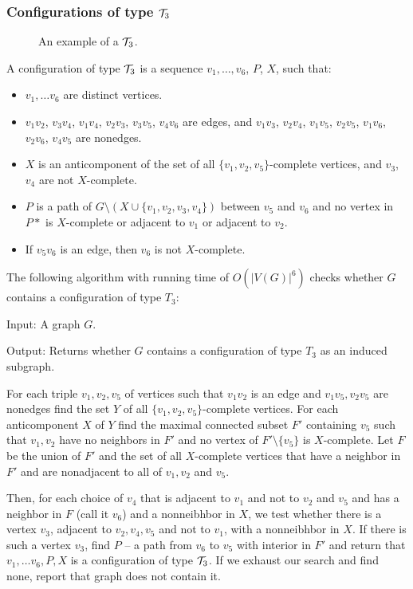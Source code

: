 \subsubsection{Configurations of type $\mathcal{T}_3$}

\begin{wrapfigure}{r}{0.35\textwidth}
	
	\caption{An example of a $\mathcal{T}_3$.}%
	\vspace{-1.5cm}
\end{wrapfigure}

A configuration of type $\mathcal{T}_3$ is a sequence $v_1, \ldots, v_6$, $P$, $X$, such that:
\begin{itemize}
	\item $v_1, \ldots v_6$ are distinct vertices.
	\item $v_1v_2$, $v_3v_4$, $v_1v_4$, $v_2v_3$, $v_3v_5$, $v_4v_6$ are edges, and $v_1v_3$, $v_2v_4$, $v_1v_5$, $v_2v_5$, $v_1v_6$, $v_2v_6$, $v_4v_5$ are nonedges.
	\item $X$ is an anticomponent of the set of all $\{v_1, v_2, v_5\}$-complete vertices, and $v_3$, $v_4$ are not $X$-complete.
	\item $P$ is a path of $G \setminus ( X \cup \{v_1, v_2, v_3, v_4\} )$ between $v_5$ and $v_6$ and no vertex in $P*$ is $X$-complete or adjacent to $v_1$ or adjacent to $v_2$.
	\item If $v_5v_6$ is an edge, then $v_6$ is not $X$-complete.
\end{itemize}

The following algorithm with running time of $O(|V(G)|^6)$ checks whether $G$ contains a configuration of type $T_3$:

\begin{alg}
	\label{alg:t3}
	Input: A graph $G$.

	\noindent Output: Returns whether $G$ contains a configuration of type $T_3$ as an induced subgraph.
\end{alg}
\begin{algtext}
	
For each triple $v_1, v_2, v_5$ of vertices such that $v_1v_2$ is an edge and $v_1v_5, v_2v_5$ are nonedges find the set $Y$ of all $\{v_1, v_2, v_5\}$-complete vertices. For each anticomponent $X$ of $Y$ find the maximal connected subset $F'$ containing $v_5$ such that $v_1, v_2$ have no neighbors in $F'$ and no vertex of $F'\setminus\{v_5\}$ is $X$-complete. Let $F$ be the union of $F'$ and the set of all $X$-complete vertices that have a neighbor in $F'$ and are nonadjacent to all of $v_1, v_2$ and $v_5$.

Then, for each choice of $v_4$ that is adjacent to $v_1$ and not to $v_2$ and $v_5$ and has a neighbor in $F$ (call it $v_6$) and a nonneibhbor in $X$, we test whether there is a vertex $v_3$, adjacent to $v_2, v_4, v_5$ and not to $v_1$, with a nonneibhbor in $X$. If there is such a vertex $v_3$, find $P$ -- a path from $v_6$ to $v_5$ with interior in $F'$ and return that $v_1, \ldots v_6, P, X$ is a configuration of type $\mathcal{T}_3$. If we exhaust our search and find none, report that graph does not contain it.
\end{algtext}

